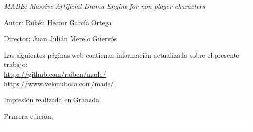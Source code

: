 
\thispagestyle{empty}

\hfill

\vfill

\medskip


\noindent
\textit{
MADE: Massive Artificial Drama Engine for non player characters
}




Autor: Rubén Héctor García Ortega

Director: Juan Julián Merelo Güervós




\vfill

\vfill

\noindent
Las siguientes páginas web contienen información actualizada sobre el presente trabajo: \\
\url{https://github.com/raiben/made/}\\
\url{https://www.velonuboso.com/made/}


\noindent
Impresión realizada en Granada

\noindent
Primera edición, 
\monthname \ \the\year

\vspace{1cm}
\hrule
\bigskip

\cleardoublepage

%
%
%
%
%
%

